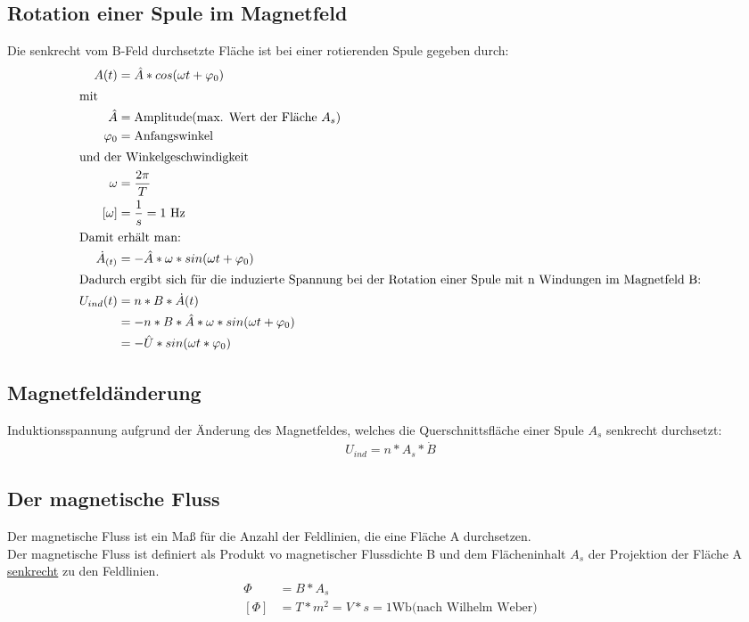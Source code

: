 	\subsection{Rotation einer Spule im Magnetfeld}
	Die senkrecht vom B-Feld durchsetzte Fläche ist bei einer rotierenden Spule gegeben durch:
		\begin{align}
		A(t)&=\hat{A}*cos(\omega t+\varphi_{0})\\
		\intertext{mit}
		\hat{A}&=\text{Amplitude(max. Wert der Fläche $A_s$)}\nonumber\\
		\varphi_{0}&=\text{Anfangswinkel}\nonumber\\
		\intertext{und der Winkelgeschwindigkeit}
		\omega&=\dfrac{2\pi}{T}\nonumber\\
		[\omega]&=\dfrac{1}{s}=1\text{ Hz}\nonumber\\
		\intertext{Damit erhält man:}
		\dot{A}_{(t)}&=-\hat{A}*\omega*sin(\omega t+\varphi_{0})\nonumber\\
		\intertext{Dadurch ergibt sich für die induzierte Spannung bei der Rotation einer Spule mit n Windungen im Magnetfeld B:}
		U_{ind}(t)&=n*B*\dot{A}(t)\nonumber\\
		&=-n*B*\hat{A}*\omega*sin(\omega t+\varphi_{0})\nonumber\\
		&=-\hat{U}*sin(\omega t*\varphi_{0})		
		\end{align}
	\subsection{Magnetfeldänderung}
	Induktionsspannung aufgrund der Änderung des Magnetfeldes, welches die Querschnittsfläche einer Spule $A_s$ senkrecht durchsetzt:
	\begin{align}
		U_{ind}=n*A_s*\dot{B}
	\end{align}
	\subsection{Der magnetische Fluss}
	Der magnetische Fluss ist ein Maß für die Anzahl der Feldlinien, die eine Fläche A durchsetzen.\\
	Der magnetische Fluss ist definiert als Produkt vo magnetischer Flussdichte B und dem Flächeninhalt $A_s$ der Projektion der Fläche A \underline{senkrecht} zu den Feldlinien.
	\begin{align}
	\Phi&=B*A_s\\
	[\Phi]&=T*m^2=V*s=1\text{Wb(nach Wilhelm Weber)}\nonumber
	\end{align}
